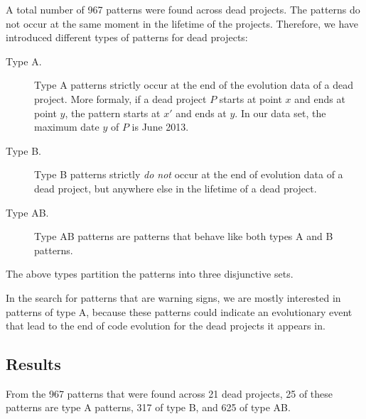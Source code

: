 A total number of 967 patterns were found across dead projects. The patterns
do not occur at the same moment in the lifetime of the projects. Therefore, we
have introduced different types of patterns for dead projects:

\begin{description}
	\item[Type A.] Type A patterns strictly occur at the end of the evolution data
		of a dead project. More formaly, if a dead project $P$ starts at point $x$ and
		ends at point $y$, the pattern starts at $x'$ and ends at $y$. In our data
		set, the maximum date $y$ of $P$ is June 2013.
	
	\item[Type B.] Type B patterns strictly \emph{do not }\rm occur at the end of
		evolution data of a dead project, but anywhere else in the lifetime of a dead
		project.
	
	\item[Type AB.] Type AB patterns are patterns that behave like both types A and
		B patterns.
\end{description}

\noindent
The above types partition the patterns into three disjunctive sets.

In the search for patterns that are warning signs, we are mostly interested in
patterns of type A, because these patterns could indicate an evolutionary event
that lead to the end of code evolution for the dead projects it appears in.

\subsection{Results}
From the 967 patterns that were found across 21 dead projects, 25 of these
patterns are type A patterns, 317 of type B, and 625 of type AB.


\begin{comment}
- Execution of the research
- Phases, steps

This chapter reports on the execution of the research method as described in Chapter 3.

If the research has been divided into phases (e.g., using sub questions) the
phases are introduced, reported on and concluded individually. If needed this
Chapter could be split up to balance out the sizes of all Chapters.
An example Research Chapter is provided as Chapter 3 at Paul’s home
page\footnote{http://homepages.cwi.nl/~paulk/thesesMasterSoftwareEngineering/2006/ReneWiegers.pdf}.
\end{comment}
